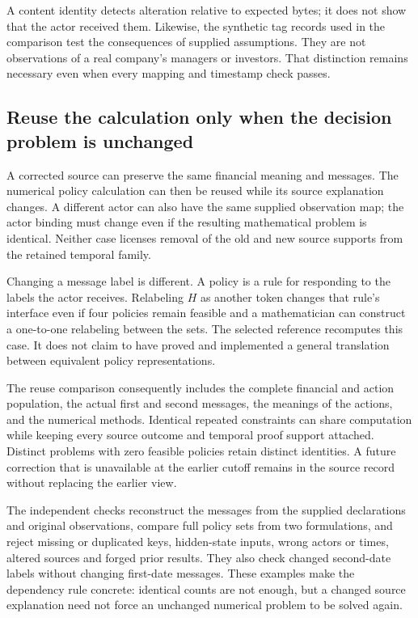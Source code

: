 A content identity detects alteration relative to expected bytes; it does not show that the actor received them. Likewise, the synthetic tag records used in the comparison test the consequences of supplied assumptions. They are not observations of a real company's managers or investors. That distinction remains necessary even when every mapping and timestamp check passes.

\subsection{Reuse the calculation only when the decision problem is unchanged}

A corrected source can preserve the same financial meaning and messages. The numerical policy calculation can then be reused while its source explanation changes. A different actor can also have the same supplied observation map; the actor binding must change even if the resulting mathematical problem is identical. Neither case licenses removal of the old and new source supports from the retained temporal family.

Changing a message label is different. A policy is a rule for responding to the labels the actor receives. Relabeling $H$ as another token changes that rule's interface even if four policies remain feasible and a mathematician can construct a one-to-one relabeling between the sets. The selected reference recomputes this case. It does not claim to have proved and implemented a general translation between equivalent policy representations.

The reuse comparison consequently includes the complete financial and action population, the actual first and second messages, the meanings of the actions, and the numerical methods. Identical repeated constraints can share computation while keeping every source outcome and temporal proof support attached. Distinct problems with zero feasible policies retain distinct identities. A future correction that is unavailable at the earlier cutoff remains in the source record without replacing the earlier view.

The independent checks reconstruct the messages from the supplied declarations and original observations, compare full policy sets from two formulations, and reject missing or duplicated keys, hidden-state inputs, wrong actors or times, altered sources and forged prior results. They also check changed second-date labels without changing first-date messages. These examples make the dependency rule concrete: identical counts are not enough, but a changed source explanation need not force an unchanged numerical problem to be solved again.

